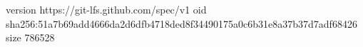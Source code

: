 version https://git-lfs.github.com/spec/v1
oid sha256:51a7b69add4666da2d6dfb4718ded8f34490175a0c6b31e8a37b37d7adf68426
size 786528
